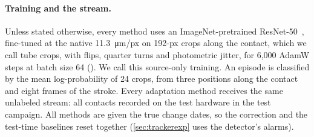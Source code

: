 \paragraph{Training and the stream.}
Unless stated otherwise, every method uses an ImageNet-pretrained ResNet-50~\cite{he2016resnet}, fine-tuned at the native \SI{11.3}{\micro\metre}/px on 192-px crops along the contact, which we call tube crops, with flips, quarter turns and photometric jitter, for 6{,}000 AdamW steps at batch size 64 (). We call this source-only training. An episode is classified by the mean log-probability of 24 crops, from three positions along the contact and eight frames of the stroke. Every adaptation method receives the same unlabeled stream: all contacts recorded on the test hardware in the test campaign. All methods are given the true change dates, so the correction and the test-time baselines reset together (\cref{sec:trackerexp} uses the detector's alarms).

